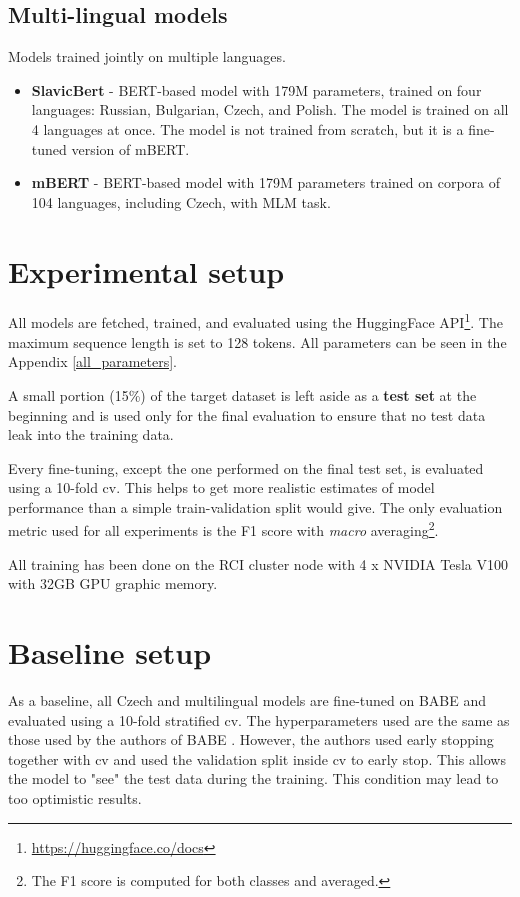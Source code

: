 \subsection{Multi-lingual models}
Models trained jointly on multiple languages.
\begin{itemize}
    \item \textbf{SlavicBert} \cite{arkhipov2019tuning} - BERT-based model with 179M parameters, trained on four languages: Russian, Bulgarian, Czech, and Polish. The model is trained on all 4 languages at once. The model is not trained from scratch, but it is a fine-tuned version of mBERT.
    \item \textbf{mBERT} \cite{devlin2019bert} - BERT-based model with 179M parameters trained on corpora of 104 languages, including Czech, with MLM task.
\end{itemize}




\section{Experimental setup}
All models are fetched, trained, and evaluated using the HuggingFace API\footnote{\url{https://huggingface.co/docs}}. The maximum sequence length is set to 128 tokens. All parameters can be seen in the Appendix \ref{all_parameters}.

A small portion (15\%) of the target dataset is left aside as a \textbf{test set} at the beginning and is used only for the final evaluation to ensure that no test data leak into the training data.

Every fine-tuning, except the one performed on the final test set, is evaluated using a 10-fold \gls{cv}. This helps to get more realistic estimates of model performance than a simple train-validation split would give. The only evaluation metric used for all experiments is the F1 score with \textit{macro} averaging\footnote{The F1 score is computed for both classes and averaged.}. 

All training has been done on the RCI cluster node with 4 x NVIDIA Tesla V100 with 32GB GPU graphic memory.





 \section{Baseline setup}
 As a baseline, all Czech and multilingual models are fine-tuned on BABE and evaluated using a 10-fold stratified \gls{cv}. The hyperparameters used are the same as those used by the authors of BABE \cite{Spinde2021MBIC}. However, the authors used early stopping together with \gls{cv} and used the validation split inside \gls{cv} to early stop. This allows the model to "see" the test data during the training. This condition may lead to too optimistic results.
 
